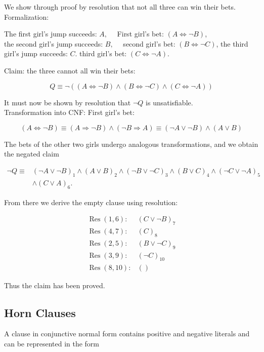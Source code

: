 \documentclass[10pt]{article}
\begin{document}
We show through proof by resolution that not all three can win their bets.\\
Formalization:

\begin{displayquote}
The first girl's jump succeeds: $A, \quad$ First girl's bet: $(A \Leftrightarrow \neg B)$,\\
the second girl's jump succeeds: $B, \quad$ second girl's bet: $(B \Leftrightarrow \neg C)$, the third girl's jump succeeds: $C$. third girl's bet: $(C \Leftrightarrow \neg A)$.
\end{displayquote}

Claim: the three cannot all win their bets:

$$
Q \equiv \neg((A \Leftrightarrow \neg B) \wedge(B \Leftrightarrow \neg C) \wedge(C \Leftrightarrow \neg A))
$$

It must now be shown by resolution that $\neg Q$ is unsatisfiable.\\
Transformation into CNF: First girl's bet:

$$
(A \Leftrightarrow \neg B) \equiv(A \Rightarrow \neg B) \wedge(\neg B \Rightarrow A) \equiv(\neg A \vee \neg B) \wedge(A \vee B)
$$

The bets of the other two girls undergo analogous transformations, and we obtain the negated claim

$$
\begin{aligned}
\neg Q \equiv & (\neg A \vee \neg B)_{1} \wedge(A \vee B)_{2} \wedge(\neg B \vee \neg C)_{3} \wedge(B \vee C)_{4} \wedge(\neg C \vee \neg A)_{5} \\
& \wedge(C \vee A)_{6} .
\end{aligned}
$$

From there we derive the empty clause using resolution:

$$
\begin{array}{ll}
\operatorname{Res}(1,6): & (C \vee \neg B)_{7} \\
\operatorname{Res}(4,7): & (C)_{8} \\
\operatorname{Res}(2,5): & (B \vee \neg C)_{9} \\
\operatorname{Res}(3,9): & (\neg C)_{10} \\
\operatorname{Res}(8,10): & ()
\end{array}
$$

Thus the claim has been proved.

\subsection*{Horn Clauses}
A clause in conjunctive normal form contains positive and negative literals and can be represented in the form
\end{document}
